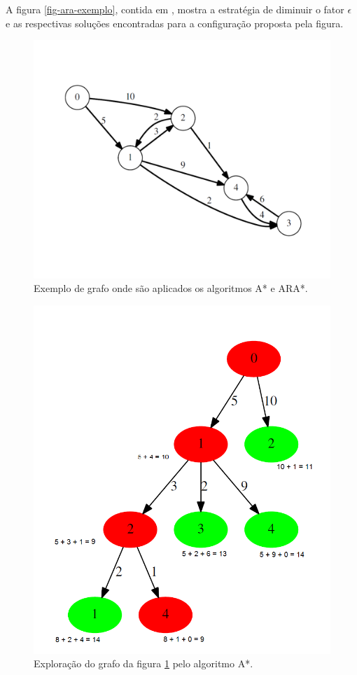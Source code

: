 A figura \ref{fig-ara-exemplo}, contida em , mostra a estratégia de diminuir o fator $\epsilon$ e as respectivas soluções encontradas para a configuração proposta pela figura.
\newpage
\begin{figure}[H]
\centering
\includegraphics[width=.70\textwidth]{figuras/ARA-exemplo3} 
\caption{Exemplo de grafo onde são aplicados os algoritmos A* e ARA*.}
\label{fig-ara-exemplo3}
\end{figure}

\begin{figure}[H]
\centering
\includegraphics[width=.70\textwidth]{figuras/ARA-exemplo1} 
\caption{Exploração do grafo da figura \ref{fig-ara-exemplo3} pelo algoritmo A*.}
\label{fig-ara-exemplo1}
\end{figure}


